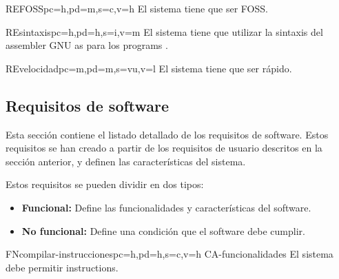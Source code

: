 \begin{userReq}{RE}{FOSS}{pc=h,pd=m,s=c,v=h}
    El sistema tiene que ser \gls{FOSS}.
\end{userReq}

\begin{userReq}{RE}{sintaxis}{pc=h,pd=h,s=i,v=m}
    El sistema tiene que utilizar la sintaxis del \gls{assembler} GNU as
    \parencite{as-manual} para los \glspl{program} .
\end{userReq}

\begin{userReq}{RE}{velocidad}{pc=m,pd=m,s=vu,v=l}
    El sistema tiene que ser rápido.
\end{userReq}

\FloatBarrier


\subsection{Requisitos de software}\label{subsec:software-requirements}

Esta sección contiene el listado detallado de los requisitos de software. Estos
requisitos se han creado a partir de los requisitos de usuario descritos en la
sección anterior, y definen las características del sistema.

\noindent
Estos requisitos se pueden dividir en dos tipos:

\begin{itemize}
    \item \textbf{Funcional:} Define las funcionalidades y características del
    software.
    \item \textbf{No funcional:} Define una condición que el software debe cumplir.
\end{itemize}

\printsreqtemplate


\begin{softwareReq}{FN}{compilar-instrucciones}{pc=h,pd=h,s=c,v=h}
    {CA-funcionalidades}
    El sistema debe permitir  \glspl{instruction}.
\end{softwareReq}

